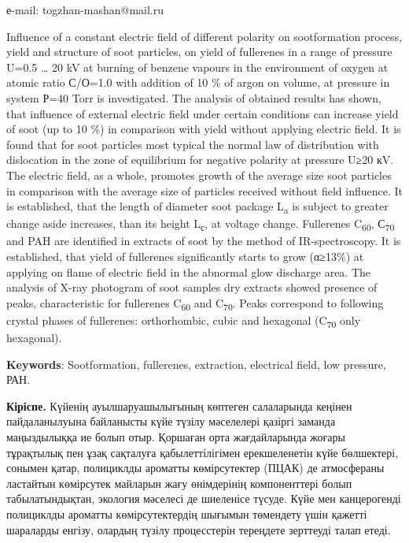 е-mail: togzhan-mashan@mail.ru

Influence of a constant electric field of different polarity on
sootformation process, yield and structure of soot particles, on yield
of fullerenes in a range of pressure U=0.5 \ldots{} 20 kV at burning of
benzene vapours in the environment of oxygen at atomic ratio С/О=1.0
with addition of 10 \% of argon on volume, at pressure in system Р=40
Torr is investigated. The analysis of obtained results has shown, that
influence of external electric field under certain conditions can
increase yield of soot (up to 10 \%) in comparison with yield without
applying electric field. It is found that for soot particles most
typical the normal law of distribution with dislocation in the zone of
equilibrium for negative polarity at pressure U≥20 кV. The electric
field, as a whole, promotes growth of the average size soot particles in
comparison with the average size of particles received without field
influence. It is established, that the length of diameter soot package
L\textsubscript{a} is subject to greater change aside increases, than
its height L\textsubscript{с}, at voltage change. Fullerenes
C\textsubscript{60}, С\textsubscript{70} and PAH are identified in
extracts of soot by the method of IR-spectroscopy. It is established,
that yield of fullerenes significantly starts to grow (α≥13\%) at
applying on flame of electric field in the abnormal glow discharge area.
The analysis of X-ray photogram of soot samples dry extracts showed
presence of peaks, characteristic for fullerenes C\textsubscript{60} and
C\textsubscript{70}. Peaks correspond to following crystal phases of
fullerenes: orthorhombic, cubic and hexagonal (C\textsubscript{70} only
hexagonal).

{\bfseries Keywords}: Sootformation, fullerenes, extraction, electrical
field, low pressure, РАН.

{\bfseries Кіріспе.} Күйенің ауылшаруашылығының көптеген салаларында
кеңінен пайдаланылуына байланысты күйе түзілу мәселелері қазіргі заманда
маңыздылыққа ие болып отыр. Қоршаған орта жағдайларында жоғары
тұрақтылық пен ұзақ сақталуға қабылеттілігімен ерекшеленетін күйе
бөлшектері, сонымен қатар, полициклды ароматты көмірсутектер (ПЦАК) де
атмосфераны ластайтын көмірсутек майларын жағу өнімдерінің компоненттері
болып табылатындықтан, экология мәселесі де шиеленісе түсуде. Күйе мен
канцерогенді полициклды ароматты көмірсутектердің шығымын төмендету үшін
қажетті шараларды енгізу, олардың түзілу процесстерін тереңдете
зерттеуді талап етеді.

